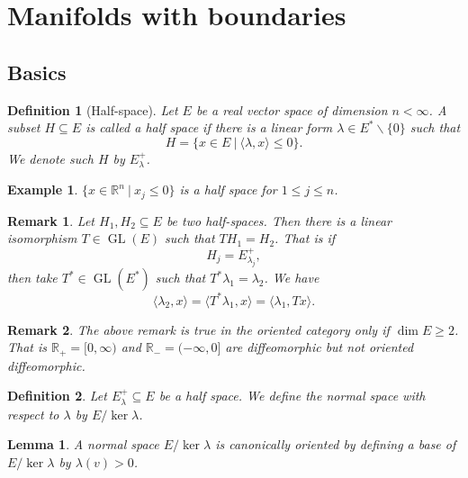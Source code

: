 \documentclass[10pt]{article}
\newtheorem{definition}{Definition}[section]
\newtheorem{lemma}{Lemma}[section]
\newtheorem{remark}{Remark}[section]
\newtheorem{example}{Example}[section]
\DeclareMathOperator{\GL}{GL}
\newcommand{\R}[0]{\mathbb{R}}
\newcommand{\sep}[0]{\:|\:}
\begin{document}
\section{Manifolds with boundaries}

\subsection{Basics}

\begin{definition}[Half-space]
  Let $E$ be a real vector space of dimension $n<\infty$. A subset $H\subseteq E$ is called a half space if there is a linear form $\lambda\in E^*\backslash\{0\}$ such that
  \begin{equation*}
    H = \{x\in E\sep \langle\lambda,x\rangle\leq0\}.
  \end{equation*}
  We denote such $H$ by $E_\lambda^+$.
\end{definition}

\begin{example}
  $\{x\in\R^n\sep x_j\leq 0\}$ is a half space for $1\leq j\leq n$.
\end{example}

\begin{remark}
  Let $H_1,H_2\subseteq E$ be two half-spaces.  Then there is a linear isomorphism $T\in\GL(E)$ such that $TH_1=H_2$. That is if 
  \begin{equation*}
    H_j = E_{\lambda_j}^+,
  \end{equation*}
  then take $T^*\in\GL(E^*)$ such that $T^*\lambda_1 = \lambda_2$. We have 
  \begin{equation*}
    \langle \lambda_2,x\rangle = \langle T^*\lambda_1,x\rangle = \langle \lambda_1,Tx\rangle.
  \end{equation*}
\end{remark}

\begin{remark}
  The above remark is true in the oriented category only if $\dim E\geq 2$. That is $\R_+=[0,\infty)$ and $\R_-=(-\infty,0]$ are diffeomorphic but not oriented diffeomorphic.
\end{remark}

\begin{definition}
  Let $E_\lambda^+\subseteq E$ be a half space. We define the normal space with respect to $\lambda$ by $E/\ker\lambda$.
\end{definition}

\begin{lemma}
  A normal space $E/\ker\lambda$ is canonically oriented by defining a base of $E/\ker\lambda$ by $\lambda(v)>0$.
\end{lemma}
\end{document}
